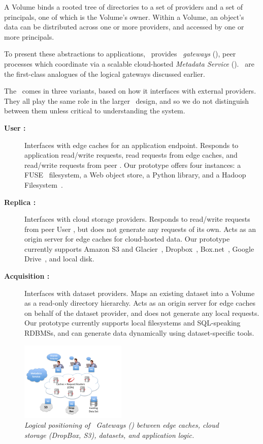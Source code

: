 A Volume binds a rooted tree of directories to a set of providers and a set of principals,
one of which is the Volume's owner.  Within a Volume, an object's data can be distributed 
across one or more providers, and accessed by one or more principals. 

To present these abstractions to applications, \Syndicate\ provides \textit{\Syndicate\ gateways}
(\SGs), peer processes which coordinate via a scalable cloud-hosted {\it Metadata Service} (\MS).
\SGs\ are the first-class analogues of the logical gateways discussed earlier.

The \SG\ comes in three variants, based on how it interfaces with external providers.
They all play the same role in the larger \Syndicate\ design, and so we do not
distinguish between them unless critical to understanding the system.

\begin{description}

\item[\bf User \SG:] Interfaces with edge caches for an application endpoint.
  Responds to application read/write requests, read requests from edge caches,
  and read/write requests from peer \SGs.  Our
  prototype offers four instances: a
  FUSE~\cite{fuse} filesystem, a Web
  object store, a Python library, and a Hadoop Filesystem~\cite{hdfs}.

\item[\bf Replica \SG:]  Interfaces with cloud storage providers.
  Responds to read/write requests from peer User \SGs, but does not generate
  any requests of its own.  Acts as an origin server for edge caches for cloud-hosted data.  Our prototype
  currently supports Amazon S3 and Glacier~\cite{aws-overview}, Dropbox~\cite{dropbox},
  Box.net~\cite{Box.net}, Google Drive~\cite{google-drive}, and local disk.

\item[\bf Acquisition \SG:]  Interfaces with dataset providers.  Maps an existing dataset
  into a Volume as a read-only directory hierarchy.  Acts as an origin server for edge caches
  on behalf of the dataset provider, and does not generate any local requests.  Our prototype currently supports
  local filesystems and SQL-speaking RDBMSs, and can generate data dynamically using 
  dataset-specific tools.

\end{description}

\begin{figure}[h!]
\centering
\includegraphics[width=0.45\textwidth]{figures/Syndicate-fig}
\caption{\it Logical positioning of \Syndicate\ Gateways (\SGs) between edge caches, cloud storage (DropBox, S3), datasets, and application logic.}
\label{fig:deployment}
\end{figure}

